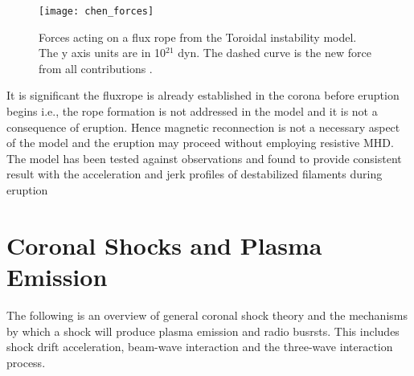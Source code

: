 \begin{figure}[!t]
\begin{center}
\texttt{[image: chen\_forces]}
\caption[The toroidal instability forces]{Forces acting on a flux rope from the Toroidal instability model. The y axis units are in 10$^21$ dyn. The dashed curve is the new force from all contributions \citep{chen1989}.}
\label{fig:chen_forces}
\end{center}
\end{figure}

It is significant the fluxrope is already established in the corona before eruption begins i.e., the rope formation is not addressed in the model and it is not a consequence of eruption. Hence magnetic reconnection is not a necessary aspect of the model and the eruption may proceed without employing resistive MHD. The model has been tested against observations and found to provide consistent result with the acceleration and jerk profiles of destabilized filaments during eruption \citep{schrijver2008}

\section{Coronal Shocks and Plasma Emission}\label{sec:3}

The following is an overview of general coronal shock theory and the mechanisms by which a shock will produce plasma emission and radio busrsts. This includes shock drift acceleration, beam-wave interaction and the three-wave interaction process. 

